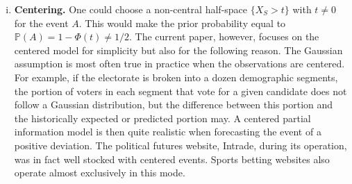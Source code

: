 \documentclass[12pt]{article}
\renewcommand{\P}{\mathbb{P}}
\theoremstyle{definition}
\theoremstyle{definition}
\def\P{{\mathbb P}}
\begin{document}
\begin{enumerate}[(i)]
\item {\bf Centering.} One could choose a non-central half-space $\{
X_S > t \}$ with $t \neq 0$ for the event $A$.  This would make the prior
probability equal to $\P(A) = 1-\Phi(t) \neq 1/2$. The current paper, however, focuses on the
centered model for simplicity but also for the following reason.  The
Gaussian assumption is most often true in practice when the
observations are centered.  For example, if the electorate
is broken into a dozen demographic segments, the portion of voters in
each segment that vote for a given candidate does not follow a
Gaussian distribution, but the difference between this portion and the
historically expected or predicted portion may.  A centered partial
information model is then quite realistic when forecasting the event
of a positive deviation.  The political futures website, Intrade,
during its operation, was in fact well stocked with centered events. 
Sports betting websites also operate
almost exclusively in this mode.
\label{item:centered}
\end{enumerate}
\end{document}

